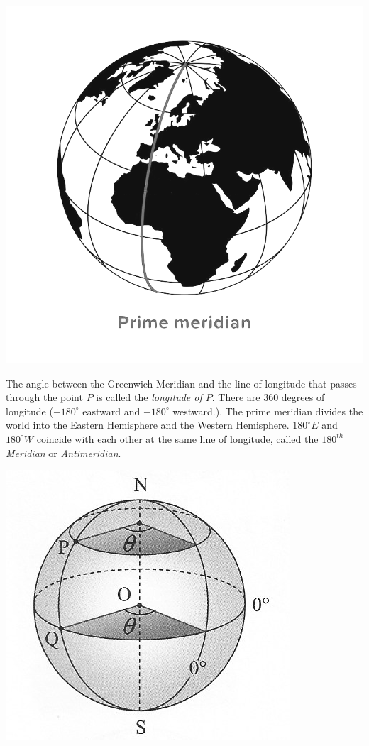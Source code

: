 \documentclass{report}
\begin{document}
\begin{multicols}{2}
    \begin{center}
        \includegraphics[scale=0.25]{primemeridian}
    \end{center}

    The angle between the Greenwich Meridian and the line of longitude that passes
    through the point $P$ is called the \emph{longitude of $P$}. There are 360
    degrees of longitude ($+180^\circ$ eastward and $-180^\circ$ westward.). The
    prime meridian divides the world into the Eastern Hemisphere and the Western
    Hemisphere. $180^{\circ}E$ and $180^{\circ}W$ coincide with each other at the
    same line of longitude, called the \emph{$180^{th}$ Meridian} or
    \emph{Antimeridian}.

    \begin{center}
        \includegraphics[scale=1.4]{longitude.png}
    \end{center}


\end{multicols}
\end{document}
